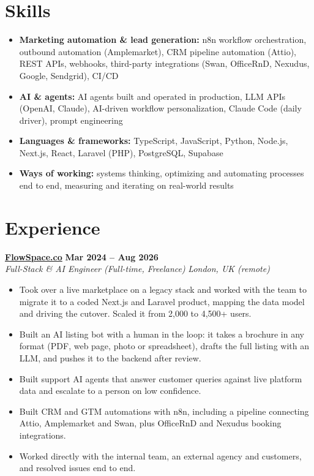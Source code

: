 \documentclass[a4paper,10pt]{article}
\newcommand{\role}[4]{%
 \textbf{#1} \hfill \textbf{#2}\\[1pt]%
 \textit{#3} \hfill \textit{#4}\\[2pt]%
}
\begin{document}
\section{Skills}
\begin{itemize}
 \item \textbf{Marketing automation \& lead generation:} n8n workflow orchestration, outbound automation (Amplemarket), CRM pipeline automation (Attio), REST APIs, webhooks, third-party integrations (Swan, OfficeRnD, Nexudus, Google, Sendgrid), CI/CD
 \item \textbf{AI \& agents:} AI agents built and operated in production, LLM APIs (OpenAI, Claude), AI-driven workflow personalization, Claude Code (daily driver), prompt engineering
 \item \textbf{Languages \& frameworks:} TypeScript, JavaScript, Python, Node.js, Next.js, React, Laravel (PHP), PostgreSQL, Supabase
 \item \textbf{Ways of working:} systems thinking, optimizing and automating processes end to end, measuring and iterating on real-world results
\end{itemize}

\section{Experience}

\role{\href{https://flowspace.co}{FlowSpace.co}}{Mar 2024 -- Aug 2026}{Full-Stack \& AI Engineer (Full-time, Freelance)}{London, UK (remote)}
\begin{itemize}
 \item Took over a live marketplace on a legacy stack and worked with the team to migrate it to a coded Next.js and Laravel product, mapping the data model and driving the cutover. Scaled it from 2,000 to 4,500+ users.
 \item Built an AI listing bot with a human in the loop: it takes a brochure in any format (PDF, web page, photo or spreadsheet), drafts the full listing with an LLM, and pushes it to the backend after review.
 \item Built support AI agents that answer customer queries against live platform data and escalate to a person on low confidence.
 \item Built CRM and GTM automations with n8n, including a pipeline connecting Attio, Amplemarket and Swan, plus OfficeRnD and Nexudus booking integrations.
 \item Worked directly with the internal team, an external agency and customers, and resolved issues end to end.
\end{itemize}
\end{document}
